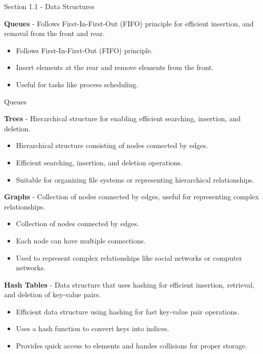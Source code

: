 \begin{notes}{Section 1.1 - Data Structures}
    \begin{highlight}[Queues]
        \textbf{Queues} - Follows First-In-First-Out (FIFO) principle for efficient insertion, and removal from the front
        and rear.
        \begin{itemize}
            \item Follows First-In-First-Out (FIFO) principle.
            \item Insert elements at the rear and remove elements from the front.
            \item Useful for tasks like process scheduling.
        \end{itemize}Queues
    \end{highlight}

    \begin{highlight}[Trees]
        \textbf{Trees} - Hierarchical structure for enabling efficient searching, insertion, and deletion.
        \begin{itemize}
            \item Hierarchical structure consisting of nodes connected by edges.
            \item Efficient searching, insertion, and deletion operations.
            \item Suitable for organizing file systems or representing hierarchical relationships.
        \end{itemize}
    \end{highlight}

    \begin{highlight}
        \textbf{Graphs} - Collection of nodes connected by edges, useful for representing complex relationships.
        \begin{itemize}
            \item Collection of nodes connected by edges.
            \item Each node can have multiple connections.
            \item Used to represent complex relationships like social networks or computer networks.
        \end{itemize}
    \end{highlight}

    \begin{highlight}
        \textbf{Hash Tables} - Data structure that uses hashing for efficient insertion, retrieval, and deletion of
        key-value pairs.
        \begin{itemize}
            \item Efficient data structure using hashing for fast key-value pair operations.
            \item Uses a hash function to convert keys into indices.
            \item Provides quick access to elements and handes collisions for proper storage.
        \end{itemize}
    \end{highlight}


\end{notes}
